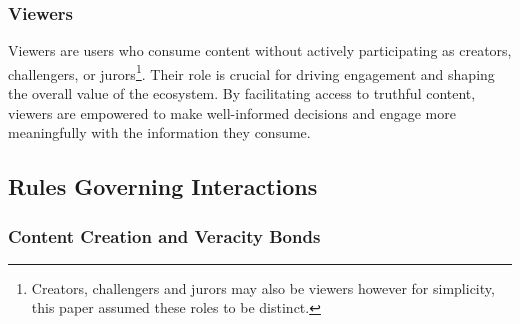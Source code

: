 \documentclass{article}
\newcommand{\sam}{\textcolor{purple}}
\begin{document}


\subsubsection{Viewers}

Viewers are users who consume content without actively participating as creators, challengers, or jurors\footnote{Creators, challengers and jurors may also be viewers however for simplicity, this paper assumed these roles to be distinct.}. Their role is crucial for driving engagement and shaping the overall value of the ecosystem. By facilitating access to truthful content, viewers are empowered to make well-informed decisions and engage more meaningfully with the information they consume.

\subsection{Rules Governing Interactions}
\subsubsection{Content Creation and Veracity Bonds}
\label{sec:content_and_bonds}
\end{document}
